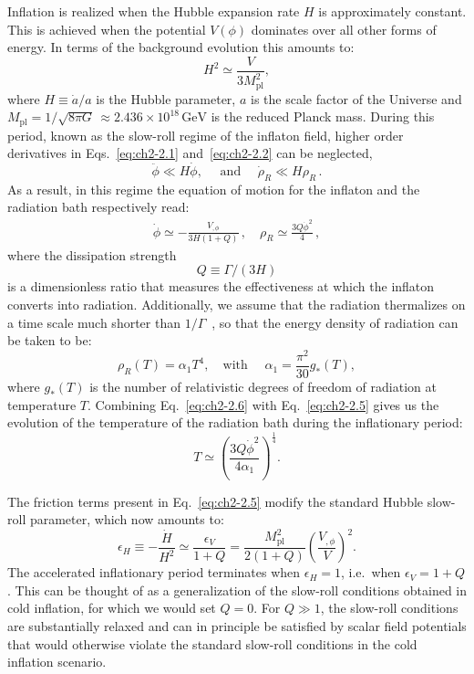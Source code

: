 Inflation is realized when the Hubble expansion rate $H$ is approximately constant. This is achieved when the potential $V(\phi)$ dominates over all other forms of energy. In terms of the background evolution this amounts to:
\begin{equation}
    H^2\simeq \frac{V}{3M_{\mathrm{pl}}^2}, \label{eq:ch2-2.3}
\end{equation}
where $H\equiv \dot{a}/a$ is the Hubble parameter, $a$ is the scale factor of the Universe and $M_{\mathrm{pl}}= 1/\sqrt{8 \pi G} \, \approx 2.436\times 10^{18}\,\mathrm{GeV}$ is the reduced Planck mass. During this period, known as the slow-roll regime of the inflaton field, higher order derivatives in Eqs.~\ref{eq:ch2-2.1} and~\ref{eq:ch2-2.2} can be neglected,
\begin{equation}
    \ddot{\phi} \ll H \dot{\phi}, \quad \text { and } \quad \dot{\rho}_{R} \ll H \rho_{R}\,. \label{eq:ch2-2.4}
\end{equation}
As a result, in this regime the equation of motion for the inflaton and the radiation bath respectively read:
\begin{align}
 \Dot{\phi}\simeq -\frac{V_{,\phi}}{3H(1+Q)}\,, \quad \rho_R\simeq \frac{3Q \Dot{\phi}^2}{4}\,, \label{eq:ch2-2.5}
\end{align}
where the dissipation strength
\begin{equation}
Q\equiv \Gamma/(3H)
\end{equation}
is a dimensionless ratio that measures the effectiveness at which the inflaton converts into radiation. Additionally, we assume that the radiation thermalizes on a time scale much shorter than $1/\Gamma$~\citep{Berera:1995ie, Berera:1995wh}, so that the energy density of radiation can be taken to be:
\begin{equation}
    \rho_R(T)=\alpha_1 T^4, \quad \text{with } \quad \alpha_1=\frac{\pi^2}{30}g_{*}(T), \label{eq:ch2-2.6}
\end{equation}
where $g_{*}(T)$ is the number of relativistic degrees of freedom of radiation at temperature $T$. Combining Eq.~\ref{eq:ch2-2.6} with Eq.~\ref{eq:ch2-2.5} gives us the evolution of the temperature of the radiation bath during the inflationary period:
\begin{equation}
    T\simeq \left( \frac{3Q \Dot{\phi}^2}{4\alpha_1}\right)^\frac{1}{4}.
    \label{eq:ch2-2.1.8}
\end{equation}

The friction terms present in Eq.~\ref{eq:ch2-2.5} modify the standard Hubble slow-roll parameter, which now amounts to:
\begin{equation}
    \epsilon_H\equiv -\frac{\dot{H}}{H^2}\simeq \frac{\epsilon_V}{1+Q}= \frac{M_{\mathrm{pl}}^{2}}{2(1+Q)}\left(\frac{V_{, \phi}}{V}\right)^{2}.
\end{equation}
The accelerated inflationary period terminates when $\epsilon_H = 1$, i.e.\ when $\epsilon_V = 1 + Q$. This can be thought of as a generalization of the slow-roll conditions obtained in cold inflation, for which we would set $Q=0$. For $Q\gg 1$, the slow-roll conditions are substantially relaxed and can in principle be satisfied by scalar field potentials that would otherwise violate the standard slow-roll conditions in the cold inflation scenario.

